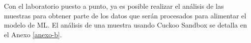 Con el laboratorio puesto a punto, ya es posible realizar el análisis de las muestras para obtener parte de los datos que serán procesados para alimentar el modelo de \gls{ML}. El análisis de una muestra usando Cuckoo Sandbox se detalla en el Anexo \ref{anexo-b}.

%